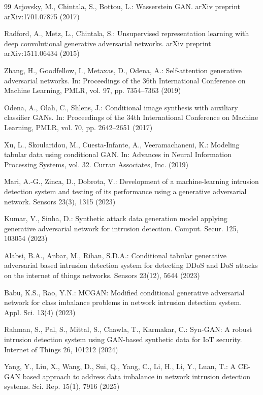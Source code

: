 \documentclass[11pt, a4paper]{article}
\begin{document}
\begin{thebibliography}{99}
Arjovsky, M., Chintala, S., Bottou, L.: Wasserstein GAN. arXiv preprint arXiv:1701.07875 (2017)

Radford, A., Metz, L., Chintala, S.: Unsupervised representation learning with deep convolutional generative adversarial networks. arXiv preprint arXiv:1511.06434 (2015)

Zhang, H., Goodfellow, I., Metaxas, D., Odena, A.: Self-attention generative adversarial networks. In: Proceedings of the 36th International Conference on Machine Learning, PMLR, vol. 97, pp. 7354--7363 (2019)

Odena, A., Olah, C., Shlens, J.: Conditional image synthesis with auxiliary classifier GANs. In: Proceedings of the 34th International Conference on Machine Learning, PMLR, vol. 70, pp. 2642--2651 (2017)

Xu, L., Skoularidou, M., Cuesta-Infante, A., Veeramachaneni, K.: Modeling tabular data using conditional GAN. In: Advances in Neural Information Processing Systems, vol. 32. Curran Associates, Inc. (2019)

Mari, A.-G., Zinca, D., Dobrota, V.: Development of a machine-learning intrusion detection system and testing of its performance using a generative adversarial network. Sensors 23(3), 1315 (2023)

Kumar, V., Sinha, D.: Synthetic attack data generation model applying generative adversarial network for intrusion detection. Comput. Secur. 125, 103054 (2023)

Alabsi, B.A., Anbar, M., Rihan, S.D.A.: Conditional tabular generative adversarial based intrusion detection system for detecting DDoS and DoS attacks on the internet of things networks. Sensors 23(12), 5644 (2023)

Babu, K.S., Rao, Y.N.: MCGAN: Modified conditional generative adversarial network for class imbalance problems in network intrusion detection system. Appl. Sci. 13(4) (2023)

Rahman, S., Pal, S., Mittal, S., Chawla, T., Karmakar, C.: Syn-GAN: A robust intrusion detection system using GAN-based synthetic data for IoT security. Internet of Things 26, 101212 (2024)

Yang, Y., Liu, X., Wang, D., Sui, Q., Yang, C., Li, H., Li, Y., Luan, T.: A CE-GAN based approach to address data imbalance in network intrusion detection systems. Sci. Rep. 15(1), 7916 (2025)


\end{thebibliography}
\end{document}

